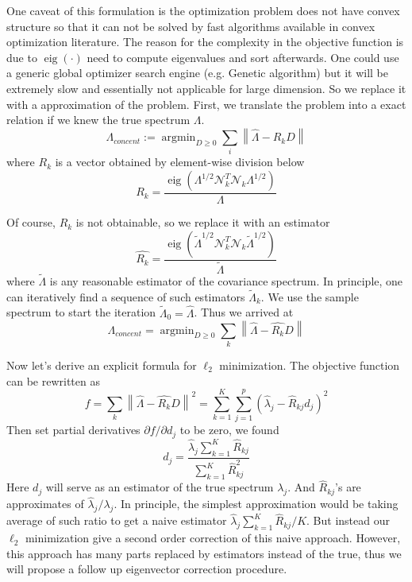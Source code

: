 \documentclass[12pt]{extarticle}
\newcommand{\cN}{{\mathcal{N}}}
\newcommand{\1}{\field{1}}
\DeclareMathOperator*{\argmin}{argmin}
\DeclareMathOperator*{\eig}{eig}
\numberwithin{equation}{section}
\begin{document}
One caveat of this formulation is the optimization problem does not have convex structure so that it can not be solved by fast algorithms available in convex optimization literature. The reason for the complexity in the objective function is due to $\eig(\cdot)$ need to compute eigenvalues and sort afterwards. One could use a generic global optimizer search engine (e.g. Genetic algorithm)  but it will be extremely slow and essentially not applicable for large dimension. So we replace it with a approximation of the problem. First, we translate the problem into a exact relation if we knew the true spectrum $\Lambda$.
\begin{equation} \label{eqn: optimization_true_ratio}
\Lambda_{concent} := \argmin_{{D}\geq 0} \sum_i \left\| \hat{\Lambda}- R_k{D}    \right\|
\end{equation}
where $R_k$ is a vector obtained by element-wise division below
\[
R_k= \frac{\eig({\Lambda}^{1/2} \cN_k^T \cN_k {\Lambda}^{1/2} )}{\Lambda}
\]

Of course, $R_k$ is not obtainable, so we replace it with an estimator 
\[
\hat{R_k}= \frac{\eig({\tilde{\Lambda}}^{1/2} \cN_k^T \cN_k \tilde{\Lambda}^{1/2} )}{\tilde{\Lambda}}
\]
where $\tilde{\Lambda}$ is any reasonable estimator of the  covariance spectrum. In principle, one can iteratively find a sequence of such  estimators $\tilde{\Lambda}_k$. We use the sample spectrum to start the iteration $\tilde{\Lambda}_0= \hat{\Lambda}$. Thus we arrived at 
\begin{equation}\label{eqn: optimization_ratio}
\Lambda_{concent}= \argmin_{{D}\geq 0} \sum_k \left\| \hat{\Lambda}- \hat{R_k}{D}    \right\|
\end{equation}

Now let's derive an explicit formula for $\ell_2$ minimization. The objective function can be rewritten as 
\[
f=\sum_k \left\| \hat{\Lambda}- \hat{R_k}{D}    \right\|^2= \sum_{k=1}^{K}\sum_{j=1}^{p} (\hat{\lambda}_j-\hat{R}_{kj}d_j)^2
\]
Then set partial derivatives $\partial f/ \partial{d_j}$ to be zero, we found 
\[
d_j=\frac{\hat{\lambda}_j \sum_{k=1}^K \hat{R}_{kj}}{\sum_{k=1}^K \hat{R}_{kj}^2 }
\]
Here  $d_j$ will serve as an estimator of the true spectrum $\lambda_j$. And $\hat{R}_{kj}$'s are approximates of ${\hat{\lambda}_j}/{\lambda_j}$. In principle, the simplest approximation would be taking average of such ratio to get a naive estimator ${\hat{\lambda}_j \sum_{k=1}^K \hat{R}_{kj}}/{K}$.
But instead our $\ell_2$ minimization give a second order correction of this naive approach. However, this approach has many parts replaced by estimators instead of the true, thus we will propose a follow up eigenvector correction procedure.
\end{document}
